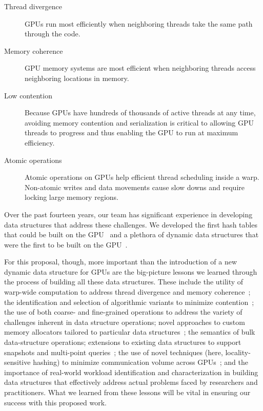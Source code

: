 \begin{description}
  \item[Thread divergence] GPUs run most efficiently when neighboring threads take the same path through the code.
  \item[Memory coherence] GPU memory systems are most efficient when neighboring threads access neighboring locations in memory.
  \item[Low contention] Because GPUs have hundreds of thousands of active threads at any time, avoiding memory contention and serialization is critical to allowing GPU threads to progress and thus enabling the GPU to run at maximum efficiency.
  \item [Atomic operations] Atomic operations on GPUs help efficient thread scheduling inside a warp. Non-atomic writes and data movements cause slow downs and require locking large memory regions.
\end{description}


Over the past fourteen years, our team has significant experience in developing data structures that address these challenges. We developed the first hash tables that could be built on the GPU~\cite{Alcantara:2009:RPH,Alcantara:2011:BAE} and a plethora of dynamic data structures that were the first to be built on the GPU~\cite{Ashkiani:2018:ADH,Ashkiani:2018:GLA,Awad:2019:EAH,Geil:2018:QFA,mccoy2022high,nisa2021distributed}.

For this proposal, though, more important than the introduction of a new dynamic data structure for GPUs are the big-picture lessons we learned through the process of building all these data structures. These include the utility of warp-wide computation to address thread divergence and memory coherence~\cite{Ashkiani:2017:PAA}; the identification and selection of algorithmic variants to minimize contention~\cite{Awad:2019:EAH}; the use of both coarse- and fine-grained operations to address the variety of challenges inherent in data structure operations; novel approaches to custom memory allocators tailored to particular data structures~\cite{Ashkiani:2018:ADH}; the semantics of bulk data-structure operations; extensions to existing data structures to support snapshots and multi-point queries~\cite{Awad:2022:AGM,mccoy2022high}; the use of novel techniques (here, locality-sensitive hashing) to minimize communication volume across GPUs~\cite{nisa2021distributed}; and the importance of real-world workload identification and characterization in building data structures that effectively address actual problems faced by researchers and practitioners. What we learned from these lessons will be vital in ensuring our success with this proposed work.


